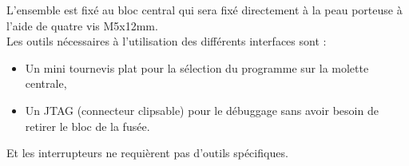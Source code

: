 L'ensemble est fixé au bloc central qui sera fixé directement à la peau porteuse à l'aide de quatre vis M5x12mm.\\

Les outils nécessaires à l'utilisation des différents interfaces sont :
\begin{itemize}
    \item Un mini tournevis plat pour la sélection du programme sur la molette centrale,
    \item Un JTAG (connecteur clipsable) pour le débuggage sans avoir besoin de retirer le bloc de la fusée.
\end{itemize}
Et les interrupteurs ne requièrent pas d'outils spécifiques.

\newpage